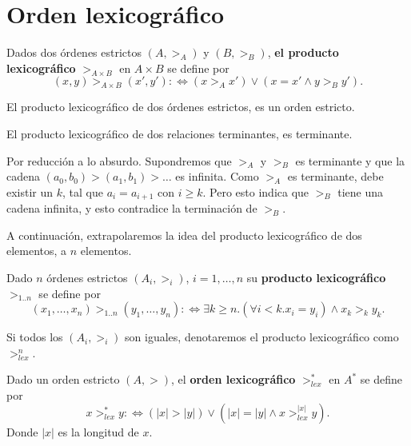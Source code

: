 
\section{Orden lexicográfico}\label{orlexi}

\begin{defi} 
  Dados dos órdenes estrictos $(A, >_A)$ y $(B, >_B)$, \textbf{el producto
  lexicográfico} $>_{A \times B}$ en $ A \times B$ se define por
  \[(x,y) >_{A \times B} (x',y') :\Leftrightarrow (x >_A x') \vee (x = x' \wedge y >_B y').\]
\end{defi}

\begin{lema}
  El producto lexicográfico de dos órdenes estrictos, es un orden estricto.
\end{lema}

\begin{teor}
  El producto lexicográfico de dos relaciones terminantes, es terminante.
\end{teor}

\begin{demo}
  Por reducción a lo absurdo. Supondremos que $>_A$ y $>_B$ es terminante y que
  la cadena $(a_0,b_0) > (a_1,b_1) > \dots$ es infinita. Como $>_A$ es
  terminante, debe existir un $k$, tal que $a_i = a_{i+1}$ con $i\geq k$. Pero
  esto indica que $>_B$ tiene una cadena infinita, y esto contradice la
  terminación de $>_B$.
\end{demo}

A continuación, extrapolaremos la idea del producto lexicográfico de dos
elementos, a $n$ elementos.

\begin{defi}
  Dado $n$ órdenes estrictos $(A_i,>_i)$, $i=1,\dots,n$ su \textbf{producto
  lexicográfico} $>_{1..n}$ se define por
  \[(x_1,\dots,x_n) >_{1..n}  (y_1,\dots,y_n) :\Leftrightarrow 
    \exists k \geq n. (\forall i < k. x_i = y_i) \wedge x_k >_k y_k.\]
\end{defi} 

\begin{nota} 
  Si todos los $(A_i,>_i)$ son iguales, denotaremos el producto lexicográfico
  como $>^n_{lex}$.
\end{nota}


\begin{defi}
  Dado un orden estricto $(A,>)$, el \textbf{orden lexicográfico} $>^*_{lex}$ en $A^*$
  se define por
  \[x >^*_{lex} y :\Leftrightarrow (|x| > |y|) \vee (|x| = |y| \wedge x >^{|x|}_{lex} y).\]
  Donde $|x|$ es la longitud de $x$.
\end{defi} 

